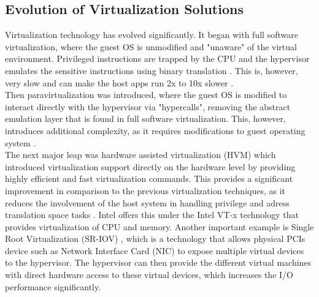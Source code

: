 \subsection{Evolution of Virtualization Solutions}
Virtualization technology has evolved significantly. It began with full software virtualization, 
where the guest OS is unmodified and "unaware" of the virtual environment. Privileged instructions 
are trapped by the CPU and the hypervisor emulates the sensitive instructions using 
binary translation \cite{virtualization_gregg}. This is, however, very slow and can make the host apps 
run 2x to 10x slower \cite{virtualization_gregg}. \\
Then paravirtualization was introduced, where the guest OS is modified to interact directly with the 
hypervisor via "hypercalls", removing the abstract emulation layer that is found in full 
software virtualization. This, however, introduces additional complexity, as it requires modifications
to guest operating system \cite{hvm}.\\ 
The next major leap was hardware assisted virtualization (HVM) which introduced virtualization support 
directly on the hardware level by providing highly efficient and fast virtualization commands. 
This provides a significant improvement in comparison to the previous virtualization 
techniques, as it reduces the involvement of the host system in handling privilege and adress translation
space tasks \cite{hvm}. Intel offers this under the Intel VT-x technology that provides virtualization of CPU and memory.
Another important example is Single Root Virtualization (SR-IOV) \cite{nitro_whitepaper}, which is a technology that allows physical 
PCIs device such as Network Interface Card (NIC) to expose multiple virtual devices to the hypervisor. 
The hypervisor can then provide the different virtual machines with direct hardware access to these virtual 
devices, which increases the I/O performance significantly. 

